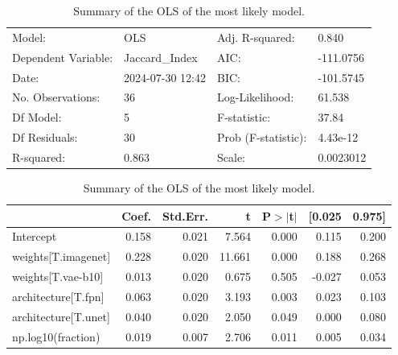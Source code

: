 \begin{table}
\caption{Summary of the OLS of the most likely model.}
\label{tab:data_fraction_parameter_influence}
\begin{center}
\begin{tabular}{llll}
\hline
Model:              & OLS              & Adj. R-squared:     & 0.840      \\
Dependent Variable: & Jaccard\_Index   & AIC:                & -111.0756  \\
Date:               & 2024-07-30 12:42 & BIC:                & -101.5745  \\
No. Observations:   & 36               & Log-Likelihood:     & 61.538     \\
Df Model:           & 5                & F-statistic:        & 37.84      \\
Df Residuals:       & 30               & Prob (F-statistic): & 4.43e-12   \\
R-squared:          & 0.863            & Scale:              & 0.0023012  \\
\hline
\end{tabular}
\end{center}

\begin{center}
\begin{tabular}{lrrrrrr}
\hline
                     & Coef. & Std.Err. &      t & P$> |$t$|$ & [0.025 & 0.975]  \\
\hline
Intercept            & 0.158 &    0.021 &  7.564 &       0.000 &  0.115 &  0.200  \\
weights[T.imagenet]  & 0.228 &    0.020 & 11.661 &       0.000 &  0.188 &  0.268  \\
weights[T.vae-b10]   & 0.013 &    0.020 &  0.675 &       0.505 & -0.027 &  0.053  \\
architecture[T.fpn]  & 0.063 &    0.020 &  3.193 &       0.003 &  0.023 &  0.103  \\
architecture[T.unet] & 0.040 &    0.020 &  2.050 &       0.049 &  0.000 &  0.080  \\
np.log10(fraction)   & 0.019 &    0.007 &  2.706 &       0.011 &  0.005 &  0.034  \\
\hline
\end{tabular}
\end{center}
\end{table}
\bigskip
